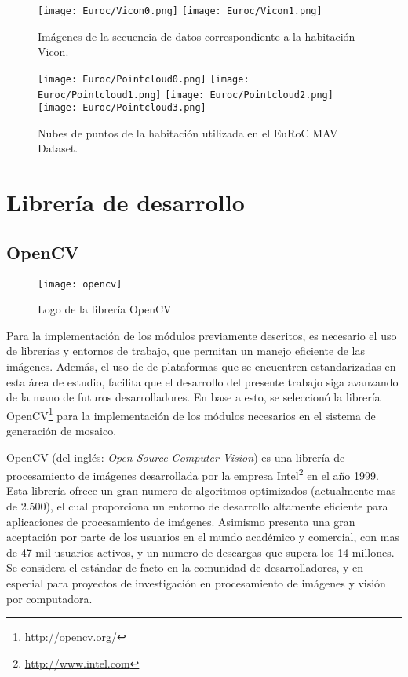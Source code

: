\begin{figure}[H]
	\centering
	\texttt{[image: Euroc/Vicon0.png]}
	\texttt{[image: Euroc/Vicon1.png]}
	\caption[Imágenes de la secuencia de datos correspondiente a la habitación Vicon]{Imágenes de la secuencia de datos correspondiente a la habitación Vicon.}
	\label{fig:vicon}
\end{figure}


\begin{figure}[H]
	\centering
	\texttt{[image: Euroc/Pointcloud0.png]}
	\texttt{[image: Euroc/Pointcloud1.png]}
	\texttt{[image: Euroc/Pointcloud2.png]}
	\texttt{[image: Euroc/Pointcloud3.png]}
	\caption[Nubes de puntos de la habitación utilizada en el EuRoC MAV Dataset]{Nubes de puntos de la habitación utilizada en el EuRoC MAV Dataset.}
	\label{fig:pointcloudEuroc}
\end{figure}



\section{Librería de desarrollo}

\subsection{OpenCV}

\begin{wrapfigure}{R}{5cm}
	\begin{center}
		\vspace*{-0.2in}
		\texttt{[image: opencv]}
	\end{center}
	\caption{Logo de la librería OpenCV}
\end{wrapfigure}

Para la implementación de los módulos previamente descritos, es necesario el uso de librerías y entornos de trabajo, que permitan un manejo eficiente de las imágenes. Además, el uso de de plataformas que se encuentren estandarizadas en esta área de estudio, facilita que el desarrollo del presente trabajo siga avanzando de la mano de futuros desarrolladores. En base a esto, se seleccionó la librería OpenCV\footnote{\url{http://opencv.org/}} para la implementación de los módulos necesarios en el sistema de generación de mosaico.

OpenCV (del inglés: \textit{Open Source Computer Vision}) es una librería de procesamiento de imágenes desarrollada por la empresa Intel\footnote{\url{http://www.intel.com}} en el año 1999. Esta librería ofrece un gran numero de algoritmos optimizados (actualmente mas de 2.500), el cual proporciona un entorno de desarrollo altamente eficiente para aplicaciones de procesamiento de imágenes. Asimismo presenta una gran aceptación por parte de los usuarios en el mundo académico y comercial, con mas de 47 mil usuarios activos, y un numero de descargas que supera los 14 millones. Se considera el estándar de facto en la comunidad de desarrolladores, y en especial para proyectos de investigación en procesamiento de imágenes y visión por computadora. 

